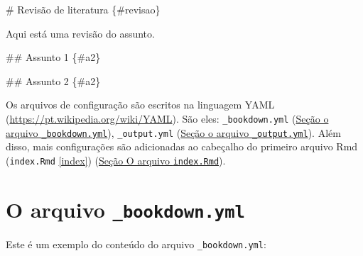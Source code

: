 \documentclass[
]{book}
\newenvironment{Shaded}{\begin{snugshade}}{\end{snugshade}}
\newcommand{\FunctionTok}[1]{\textcolor[rgb]{0.00,0.00,0.00}{#1}}
\newcommand{\NormalTok}[1]{#1}
\begin{document}
\begin{Shaded}
\begin{Highlighting}[]
\FunctionTok{\# Revisão de literatura \{\#revisao\}}

\NormalTok{Aqui está uma revisão do assunto.}

\FunctionTok{\#\# Assunto 1 \{\#a2\}}

\FunctionTok{\#\# Assunto 2 \{\#a2\}}
\end{Highlighting}
\end{Shaded}

Os arquivos de configuração são escritos na linguagem YAML (\url{https://pt.wikipedia.org/wiki/YAML}). São eles: \texttt{\_bookdown.yml} (\protect\hyperlink{bkd}{Seção o arquivo \texttt{\_bookdown.yml}}), \texttt{\_output.yml} (\protect\hyperlink{output}{Seção o arquivo \texttt{\_output.yml}}). Além disso, mais configurações são adicionadas ao cabeçalho do primeiro arquivo Rmd (\texttt{index.Rmd} \ref{index}) (\protect\hyperlink{index}{Seção O arquivo \texttt{index.Rmd}}).

\hypertarget{bkd}{%
\chapter{\texorpdfstring{O arquivo \texttt{\_bookdown.yml}}{O arquivo \_bookdown.yml}}\label{bkd}}

Este é um exemplo do conteúdo do arquivo \texttt{\_bookdown.yml}:
\end{document}

